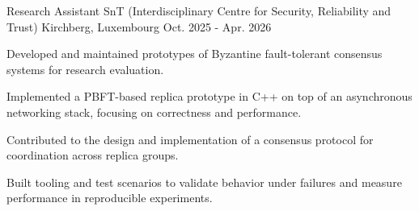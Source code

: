 

\begin{cventries}

  \cventry
    {Research Assistant}
    {SnT (Interdisciplinary Centre for Security, Reliability and Trust)}
    {Kirchberg, Luxembourg}
    {Oct. 2025 - Apr. 2026}
    {
      \begin{cvitems}
        \item {Developed and maintained prototypes of Byzantine fault-tolerant consensus systems for research evaluation.}
        \item {Implemented a PBFT-based replica prototype in C++ on top of an asynchronous networking stack, focusing on correctness and performance.}
        \item {Contributed to the design and implementation of a consensus protocol for coordination across replica groups.}
        \item {Built tooling and test scenarios to validate behavior under failures and measure performance in reproducible experiments.}
      \end{cvitems}
    }
\end{cventries}

